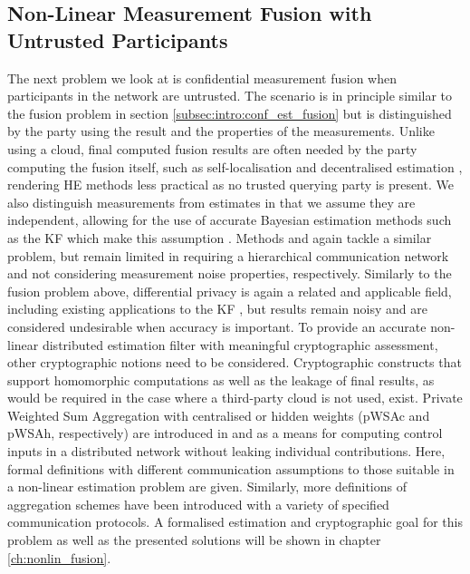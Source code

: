 \subsection{Non-Linear Measurement Fusion with Untrusted Participants}\label{subsec:intro:conf_nonlin_measurements}
The next problem we look at is confidential measurement fusion when participants in the network are untrusted. The scenario is in principle similar to the fusion problem in section \ref{subsec:intro:conf_est_fusion} but is distinguished by the party using the result and the properties of the measurements. Unlike using a cloud, final computed fusion results are often needed by the party computing the fusion itself, such as self-localisation and decentralised estimation \cite{sridharCooperativePerceptionAutonomous2019,grimeDataFusionDecentralized1994,pintoSelflocalisationIndoorMobile2013}, rendering HE methods less practical as no trusted querying party is present. We also distinguish measurements from estimates in that we assume they are independent, allowing for the use of accurate Bayesian estimation methods such as the KF which make this assumption \cite{haugBayesianEstimationTracking2012}. Methods \cite{aristovEncryptedMultisensorInformation2018} and \cite{alanwarPrOLocResilientLocalization2017} again tackle a similar problem, but remain limited in requiring a hierarchical communication network and not considering measurement noise properties, respectively. Similarly to the fusion problem above, differential privacy \cite{dworkDifferentialPrivacySurvey2008} is again a related and applicable field, including existing applications to the KF \cite{lenyDifferentiallyPrivateFiltering2014}, but results remain noisy and are considered undesirable when accuracy is important. To provide an accurate non-linear distributed estimation filter with meaningful cryptographic assessment, other cryptographic notions need to be considered. Cryptographic constructs that support homomorphic computations as well as the leakage of final results, as would be required in the case where a third-party cloud is not used, exist. Private Weighted Sum Aggregation with centralised or hidden weights (pWSAc and pWSAh, respectively) are introduced in \cite{schulzedarupEncryptedCooperativeControl2019} and \cite{alexandruPrivateWeightedSum2022} as a means for computing control inputs in a distributed network without leaking individual contributions. Here, formal definitions with different communication assumptions to those suitable in a non-linear estimation problem are given. Similarly, more definitions of aggregation schemes have been introduced \cite{shiPrivacyPreservingAggregationTimeSeries2011,joyeScalableSchemePrivacyPreserving2013,benhamoudaNewFrameworkPrivacyPreserving2016,darcoProbabilisticSecretSharing2018,beckerRevisitingPrivateStream2018,chanPrivacyPreservingStreamAggregation2012} with a variety of specified communication protocols. A formalised estimation and cryptographic goal for this problem as well as the presented solutions will be shown in chapter \ref{ch:nonlin_fusion}.

